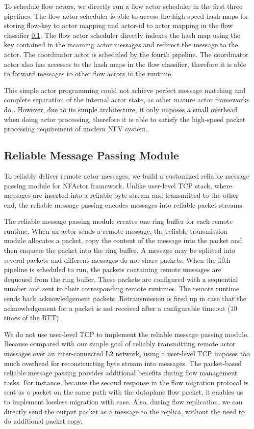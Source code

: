 To schedule flow actors, we directly run a flow actor scheduler in the first three pipelines. The flow actor scheduler is able to access the high-speed hash maps for storing flow-key to actor mapping and actor-id to actor mapping in the flow classifier \ref{}. The flow actor scheduler directly indexes the hash map using the key contained in the incoming actor messages and redirect the message to the actor. The coordinator actor is scheduled by the fourth pipeline. The coordinator actor also has accesses to the hash maps in the flow classifier, therefore it is able to forward messages to other flow actors in the runtime.

This simple actor programming could not achieve perfect message matching and complete separation of the internal actor state, as other mature actor frameworks do \cite{akka} \cite{caf}. However, due to its simple architecture, it only imposes a small overhead when doing actor processing, therefore it is able to satisfy the high-speed packet processing requirement of modern NFV system.

\subsection{Reliable Message Passing Module}

To reliably deliver remote actor messages, we build a customized reliable message passing module for NFActor framework. Unlike user-level TCP stack, where messages are inserted into a reliable byte stream and transmitted to the other end, the reliable message passing encodes messages into reliable packet streams.

The reliable message passing module creates one ring buffer for each remote runtime. When an actor sends a remote message, the reliable transmission module allocates a packet, copy the content of the message into the packet and then enqueue the packet into the ring buffer. A message may be splitted into several packets and different messages do not share packets. When the fifth pipeline is scheduled to run, the packets containing remote messages are dequeued from the ring buffer. These packets are configured with a sequential number and sent to their corresponding remote runtimes. The remote runtime sends back acknowledgement packets. Retransmission is fired up in case that the acknowledgement for a packet is not received after a configurable timeout (10 times of the RTT).

We do not use user-level TCP \cite{mtcp} to implement the reliable message passing module. Because compared with our simple goal of reliably transmitting remote actor messages over an inter-connected L2 network, using a user-level TCP imposes too much overhead for reconstructing byte stream into messages. The packet-based reliable message passing provides additional benefits during flow management tasks. For instance, because the second response in the flow migration protocol is sent as a packet on the same path with the dataplane flow packet, it enables us to implement lossless migration with ease. Also, during flow replication, we can directly send the output packet as a message to the replica, without the need to do additional packet copy. 
